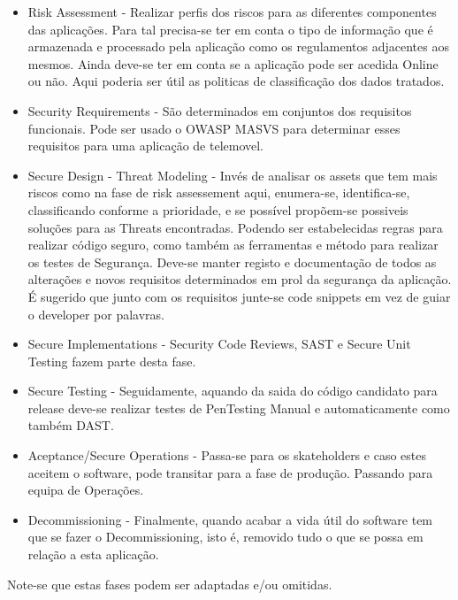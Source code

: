 \begin{itemize}

\item Risk Assessment - Realizar perfis dos riscos para as diferentes componentes das aplicações. Para tal precisa-se ter em conta o tipo de informação que é armazenada e processado pela aplicação como os regulamentos adjacentes aos mesmos. Ainda deve-se ter em conta se a aplicação pode ser acedida Online ou não. Aqui poderia ser útil as politicas de classificação dos dados tratados.

\item Security Requirements - São determinados em conjuntos dos requisitos funcionais. Pode ser usado o OWASP MASVS para determinar esses requisitos para uma aplicação de telemovel.

\item Secure Design - Threat Modeling - Invés de analisar os assets que tem mais riscos como na fase de risk assessement aqui, enumera-se, identifica-se, classificando conforme a prioridade, e se possível propõem-se possiveis soluções para as Threats encontradas. Podendo ser estabelecidas regras para realizar código seguro, como também as ferramentas e método para realizar os testes de Segurança. Deve-se manter registo e documentação de todos as alterações e novos requisitos determinados em prol da segurança da aplicação. É sugerido que junto com os requisitos junte-se code snippets em vez de guiar o developer por palavras.

\item Secure Implementations - Security Code Reviews, SAST e Secure Unit Testing fazem parte desta fase.

\item Secure Testing -  Seguidamente, aquando da saida do código candidato para release deve-se realizar testes de PenTesting Manual e automaticamente como também DAST.

\item Aceptance/Secure Operations - Passa-se para os skateholders e caso estes aceitem o software, pode transitar para a fase de produção. Passando para equipa de Operações.

\item Decommissioning -  Finalmente, quando acabar a vida útil do software tem que se fazer o Decommissioning, isto é, removido tudo o que se possa em relação a esta aplicação.

\end{itemize}

Note-se que estas fases podem ser adaptadas e/ou omitidas.

